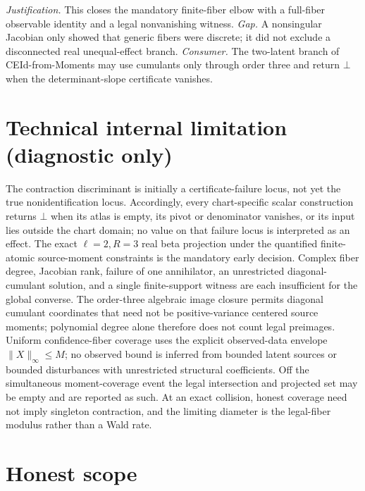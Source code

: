 \documentclass{article}
\begin{document}
\par\smallskip\noindent \textit{Justification.} This closes the mandatory finite-fiber elbow with a full-fiber observable identity and a legal nonvanishing witness. \textit{Gap.} A nonsingular Jacobian only showed that generic fibers were discrete; it did not exclude a disconnected real unequal-effect branch. \textit{Consumer.} The two-latent branch of CEId-from-Moments may use cumulants only through order three and return \(\bot\) when the determinant-slope certificate vanishes.

\section*{Technical internal limitation (diagnostic only)}

The contraction discriminant is initially a certificate-failure locus, not yet the true nonidentification locus. Accordingly, every chart-specific scalar construction returns \(\bot\) when its atlas is empty, its pivot or denominator vanishes, or its input lies outside the chart domain; no value on that failure locus is interpreted as an effect. The exact \(\ell=2,R=3\) real beta projection under the quantified finite-atomic source-moment constraints is the mandatory early decision. Complex fiber degree, Jacobian rank, failure of one annihilator, an unrestricted diagonal-cumulant solution, and a single finite-support witness are each insufficient for the global converse. The order-three algebraic image closure permits diagonal cumulant coordinates that need not be positive-variance centered source moments; polynomial degree alone therefore does not count legal preimages. Uniform confidence-fiber coverage uses the explicit observed-data envelope \(\lVert X\rVert_{\infty}\le M\); no observed bound is inferred from bounded latent sources or bounded disturbances with unrestricted structural coefficients. Off the simultaneous moment-coverage event the legal intersection and projected set may be empty and are reported as such. At an exact collision, honest coverage need not imply singleton contraction, and the limiting diameter is the legal-fiber modulus rather than a Wald rate.

\section{Honest scope}
\end{document}
